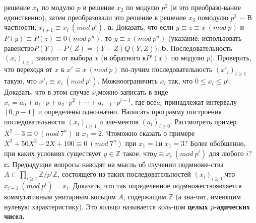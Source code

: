 \documentclass{mai_book}
\begin{document}
\noindent решение $x_1$ по модулю $p$ в решение $x_2$ по модулю $p^2$ (и это преобразо-\newline вание единственно), затем преобразовали это решение в решение $x_3$ по\newline модулю $p^3$ $\cdots$ В частности, $x_{i+1}\equiv x_i\ (mod\ p^i)$.\newline
\hspace*{15pt}\textbf{a.} Доказать, что если $y\equiv z\equiv x\ (mod\ p)$ и $P(y)\equiv P(z)\equiv 0$\newline $(mod\ p^n)$, то $y\equiv z\ (mod\ p^n)$ (указание: использовать равенство\newline $P(Y) - P(Z)=(Y-Z)Q(Y,Z)).$\newline
\hspace*{15pt}\textbf{b.} Последовательность $(x_i)_{i\geqslant1}$ зависит от выбора $x$ (и обратного к\newline $P'(x)$ по модулю $p$). Проверить, что переходя от $x$ к $x'\equiv x\ (mod\ p)$ по-\newline лучим последовательность $(x'_i)_{i\geqslant1}$ такую, что $x'_i\equiv x_i\ (mod\ p^i)$. Можно\newline ограничить $x_i$ так, что $0\leqslant x_i \leqslant p^i.$ Доказать, что в этом случае $x_i$\newline можно записать в виде $x_i=a_0+a_1\cdot p + a_2\cdot p^2+\cdots + a_{i-1}\cdot p^{i-1}$, где все\newline $a_i$ принадлежат интервалу $[0,p-1]$ и определены однозначно.\newline
\hspace*{15pt} Написать программу построения последовательности $(x_i)_{i\geqslant1}$ и эле-\newline ментов $(a_i)_{i\geqslant0}$. Рассмотреть пример $X^2-3\equiv 0\ (mod\ 7^n)$ и $x_1=2.$ Что\newline можно сказать о примере $X^3+50X^2-2X+100\equiv 0\ (mod\ 7^n)$ при $x_1=1$\newline и $x_1=3$? Более обобщенно, при каких условиях существует $y\in \mathbb{Z}$ такое, что\newline $y\equiv x_i\ (mod\ p^i)$ для любого $i$?\newline
\hspace*{15pt}\textbf{c.} Предыдущие вопросы наводят на мысль об изучении подмноже-\newline ства $A \subset \prod_{i\geqslant 1} \mathbb{Z}/p^i\mathbb{Z}$, состоящего из таких последовательностей $(x_i)_{i\geqslant1}$,\newline что $x_{i+1}\ (mod\ p^i)=x_i$. Доказать, что так определенное подмножество\newline является коммутативным унитарным кольцом $A$, содержащим  $\mathbb{Z}$ (а зна-\newline чит, имеющим нулевую характеристику). Это кольцо называется коль-\newline цом \textbf{ целых $p$-адических чисел.}\newline
\end{document}
